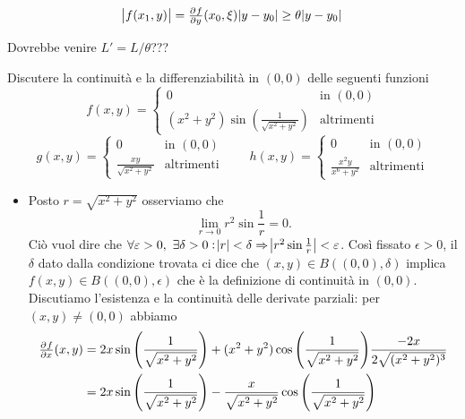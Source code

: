 \documentclass[a4paper]{article}\par \usepackage{style}\par
\begin{document}
\begin{equation*}
  \abs{f(x_1, y)} = \pd{f}{y}(x_0, \xi) \abs{y - y_0} \geq \theta \abs{y - y_0}
\end{equation*}\par Dovrebbe venire $ L' = L/\theta $???\par \begin{es}
  Discutere la continuità e la differenziabilità in $ (0, 0) $ delle seguenti funzioni
  \begin{equation*}
    f(x, y) =
    \begin{cases}
      0 & \text{in } (0, 0) \\
      (x^2 + y^2) \sin{\left(\frac{1}{\sqrt{x^2 + y^2}}\right)} & \text{altrimenti}
    \end{cases}
  \end{equation*}
  \begin{equation*}
    g(x, y) =
    \begin{cases}
      0 & \text{in } (0, 0) \\
      \frac{xy}{\sqrt{x^2 + y^2}} & \text{altrimenti}
    \end{cases}
    \qquad
    h(x, y) = \begin{cases}
      0 & \text{in } (0, 0) \\
      \frac{x^2 y}{x^6 + y^2} & \text{altrimenti}
    \end{cases}
  \end{equation*}
\end{es}\par \begin{itemize}
\item Posto $ r = \sqrt{x^2 + y^2} $ osserviamo che \[\lim_{r \to 0} r^2 \sin{\frac{1}{r}} = 0.\] Ciò vuol dire che $ \forall \epsilon > 0, \ \exists \delta > 0 : \abs{r} < \delta \Rightarrow \abs{r^2 \sin{\frac{1}{r}}} < \epsilon $. Così fissato $ \epsilon > 0 $, il $ \delta $ dato dalla condizione trovata ci dice che $ (x, y) \in B((0, 0), \delta) $ implica $ f(x, y) \in B((0, 0), \epsilon) $ che è la definizione di continuità in $ (0, 0) $. \\
  Discutiamo l'esistenza e la continuità delle derivate parziali: per $ (x, y) \neq (0, 0) $ abbiamo
  \begin{align*}
    \pd{f}{x}(x, y) & = 2x \sin{\left(\frac{1}{\sqrt{x^2 + y^2}}\right)} + (x^2 + y^2) \cos{\left(\frac{1}{\sqrt{x^2 + y^2}}\right)} \frac{- 2x}{2 \sqrt{(x^2 + y^2)^3}} \\
                    & = 2x \sin{\left(\frac{1}{\sqrt{x^2 + y^2}}\right)} - \frac{x}{\sqrt{x^2 + y^2}} \cos{\left(\frac{1}{\sqrt{x^2 + y^2}}\right)}

\end{align*}
\end{itemize}
\end{document}
